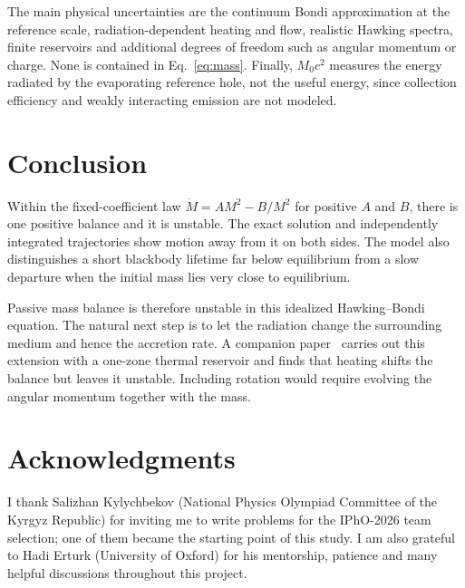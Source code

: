 \documentclass[11pt,a4paper]{article}
\begin{document}
The main physical uncertainties are the continuum Bondi approximation at the reference scale, radiation-dependent heating and flow, realistic Hawking spectra, finite reservoirs and additional degrees of freedom such as angular momentum or charge. None is contained in Eq.~\eqref{eq:mass}. Finally, $M_0c^2$ measures the energy radiated by the evaporating reference hole, not the useful energy, since collection efficiency and weakly interacting emission are not modeled.

\section{Conclusion}
Within the fixed-coefficient law $\dot M=AM^2-B/M^2$ for positive $A$ and $B$, there is one positive balance and it is unstable. The exact solution and independently integrated trajectories show motion away from it on both sides. The model also distinguishes a short blackbody lifetime far below equilibrium from a slow departure when the initial mass lies very close to equilibrium.

Passive mass balance is therefore unstable in this idealized Hawking--Bondi equation. The natural next step is to let the radiation change the surrounding medium and hence the accretion rate. A companion paper~\cite{paperII} carries out this extension with a one-zone thermal reservoir and finds that heating shifts the balance but leaves it unstable. Including rotation would require evolving the angular momentum together with the mass.

\section*{Acknowledgments}
I thank Salizhan Kylychbekov (National Physics Olympiad Committee of the Kyrgyz Republic) for inviting me to write problems for the IPhO-2026 team selection; one of them became the starting point of this study. I am also grateful to Hadi Erturk (University of Oxford) for his mentorship, patience and many helpful discussions throughout this project.

\appendix
\end{document}

